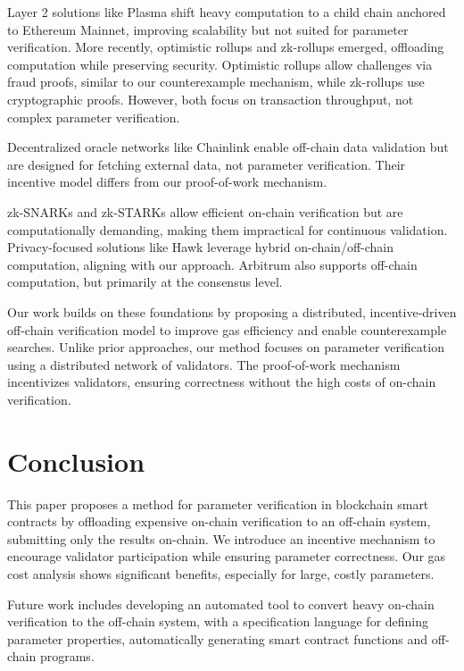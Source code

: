 \documentclass[runningheads]{llncs}
\begin{document}
Layer 2 solutions like Plasma \cite{plasma-whitepaper} shift heavy computation to a child chain anchored to Ethereum Mainnet, improving scalability but not suited for parameter verification. More recently, optimistic rollups \cite{optimisticrollups} and zk-rollups \cite{zkrollups} emerged, offloading computation while preserving security. Optimistic rollups allow challenges via fraud proofs, similar to our counterexample mechanism, while zk-rollups use cryptographic proofs. However, both focus on transaction throughput, not complex parameter verification.

Decentralized oracle networks like Chainlink \cite{chainlink} enable off-chain data validation but are designed for fetching external data, not parameter verification. Their incentive model differs from our proof-of-work mechanism.

zk-SNARKs and zk-STARKs \cite{groth2016snarks} allow efficient on-chain verification but are computationally demanding, making them impractical for continuous validation. Privacy-focused solutions like Hawk \cite{7546538} leverage hybrid on-chain/off-chain computation, aligning with our approach. Arbitrum \cite{10.5555/3277203.3277305} also supports off-chain computation, but primarily at the consensus level.

Our work builds on these foundations by proposing a distributed, incentive-driven off-chain verification model to improve gas efficiency and enable counterexample searches. Unlike prior approaches, our method focuses on parameter verification using a distributed network of validators. The proof-of-work mechanism incentivizes validators, ensuring correctness without the high costs of on-chain verification.
\section{Conclusion}
\label{sec:conclusion}
This paper proposes a method for parameter verification in blockchain smart contracts by offloading expensive on-chain verification to an off-chain system, submitting only the results on-chain. We introduce an incentive mechanism to encourage validator participation while ensuring parameter correctness. Our gas cost analysis shows significant benefits, especially for large, costly parameters.

Future work includes developing an automated tool to convert heavy on-chain verification to the off-chain system, with a specification language for defining parameter properties, automatically generating smart contract functions and off-chain programs.
\newpage


\end{document}

